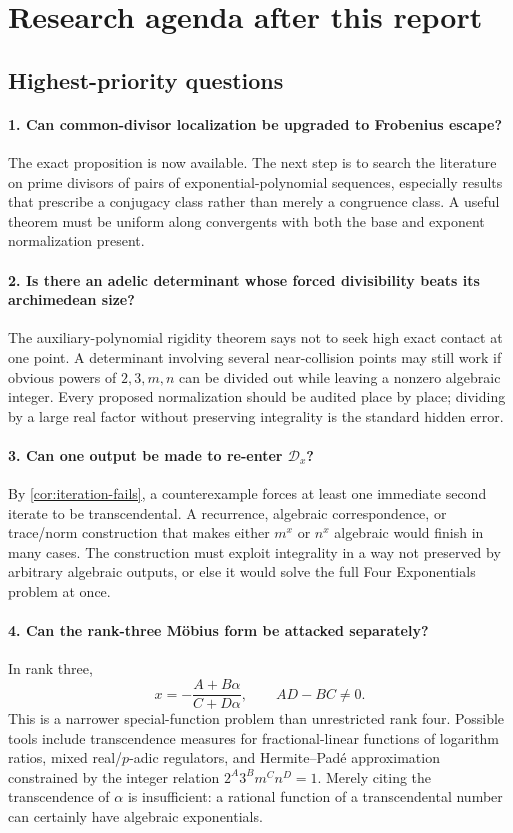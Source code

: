 \documentclass[11pt,oneside]{article}
\theoremstyle{definition}
\theoremstyle{remark}
\begin{document}
\section{Research agenda after this report}\label{sec:agenda}

\subsection{Highest-priority questions}

\paragraph{1. Can common-divisor localization be upgraded to Frobenius
escape?}
The exact proposition is now available.  The next step is to search the
literature on prime divisors of pairs of exponential-polynomial sequences,
especially results that prescribe a conjugacy class rather than merely a
congruence class.  A useful theorem must be uniform along convergents with
both the base and exponent normalization present.

\paragraph{2. Is there an adelic determinant whose forced divisibility beats
its archimedean size?}
The auxiliary-polynomial rigidity theorem says not to seek high exact contact
at one point.  A determinant involving several near-collision points may
still work if obvious powers of $2,3,m,n$ can be divided out while leaving a
nonzero algebraic integer.  Every proposed normalization should be audited
place by place; dividing by a large real factor without preserving
integrality is the standard hidden error.

\paragraph{3. Can one output be made to re-enter $\mathcal D_x$?}
By \cref{cor:iteration-fails}, a counterexample forces at least one immediate
second iterate to be transcendental.  A recurrence, algebraic correspondence,
or trace/norm construction that makes either $m^x$ or $n^x$ algebraic would
finish in many cases.  The construction must exploit integrality in a way
not preserved by arbitrary algebraic outputs, or else it would solve the
full Four Exponentials problem at once.

\paragraph{4. Can the rank-three Möbius form be attacked separately?}
In rank three,
\[
 x=-\frac{A+B\alpha}{C+D\alpha},\qquad AD-BC\ne0.
\]
This is a narrower special-function problem than unrestricted rank four.
Possible tools include transcendence measures for fractional-linear
functions of logarithm ratios, mixed real/$p$-adic regulators, and
Hermite--Pad\'e approximation constrained by the integer relation
$2^A3^Bm^Cn^D=1$.  Merely citing the transcendence of $\alpha$ is
insufficient: a rational function of a transcendental number can certainly
have algebraic exponentials.
\end{document}
